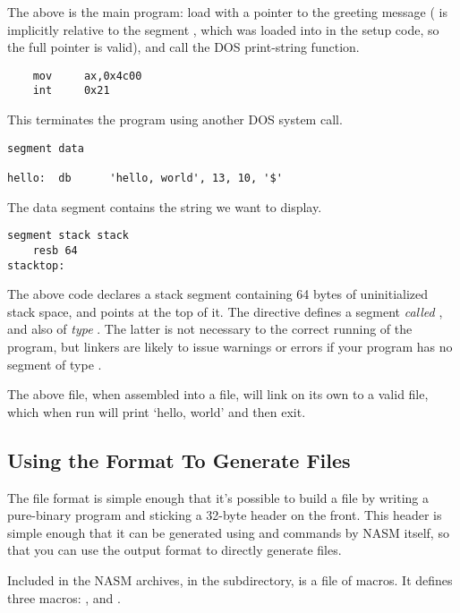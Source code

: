 The above is the main program: load  with a pointer to the
greeting message ( is implicitly relative to the segment
, which was loaded into  in the setup code, so the
full pointer is valid), and call the DOS print-string function.

\begin{lstlisting}
    mov     ax,0x4c00
    int     0x21
\end{lstlisting}

This terminates the program using another DOS system call.

\begin{lstlisting}
segment data

hello:  db      'hello, world', 13, 10, '$'
\end{lstlisting}

The data segment contains the string we want to display.

\begin{lstlisting}
segment stack stack
    resb 64
stacktop:
\end{lstlisting}

The above code declares a stack segment containing 64 bytes of
uninitialized stack space, and points  at the top of it.
The directive  defines a segment \emph{called}
, and also of \emph{type} . The latter is not
necessary to the correct running of the program, but linkers are
likely to issue warnings or errors if your program has no segment of
type .

The above file, when assembled into a  file, will link on
its own to a valid  file, which when run will print `hello,
world' and then exit.

\subsection{Using the  Format To Generate  Files}
\label{subsec:binexe}

The  file format is simple enough that it's possible to
build a  file by writing a pure-binary program and sticking
a 32-byte header on the front. This header is simple enough that it
can be generated using  and  commands by NASM itself,
so that you can use the  output format to directly generate
 files.

Included in the NASM archives, in the 
subdirectory, is a file  of macros. It defines three
macros: ,  and
.


